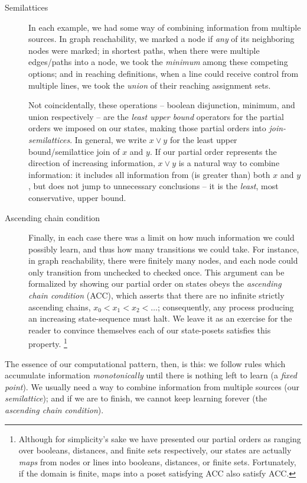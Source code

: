 \begin{description}
\item[Semilattices] In each example, we had some way of combining information
  from multiple sources. In graph reachability, we marked a node if \emph{any}
  of its neighboring nodes were marked; in shortest paths, when there were
  multiple edges/paths into a node, we took the \emph{minimum} among these
  competing options; and in reaching definitions, when a line could receive
  control from multiple lines, we took the \emph{union} of their reaching
  assignment sets.

  Not coincidentally, these operations -- boolean disjunction, minimum, and
  union respectively -- are the \emph{least upper bound} operators for the
  partial orders we imposed on our states, making those partial orders into
  \emph{join-semilattices}.
%
  In general, we write $x \vee y$ for the least upper bound/semilattice join of
  $x$ and $y$. If our partial order represents the direction of increasing
  information, $x \vee y$ is a natural way to combine information: it includes
  all information from (is greater than) both $x$ and $y$, but does not jump to
  unnecessary conclusions -- it is the \emph{least}, most conservative, upper
  bound.

\item[Ascending chain condition] Finally, in each case there was a limit on how
  much information we could possibly learn, and thus how many transitions we
  could take. For instance, in graph reachability, there were finitely many
  nodes, and each node could only transition from unchecked to checked once.
%
  This argument can be formalized by showing our partial order on states obeys
  the \emph{ascending chain condition} (ACC), which asserts that there are no
  infinite strictly ascending chains, $x_0 < x_1 < x_2 < \dots$; consequently,
  any process producing an increasing state-sequence must halt.
%
  We leave it as an exercise for the reader to convince themselves each of our
  state-posets satisfies this property.%
%
  \footnote{Although for simplicity's sake we have presented our partial orders
    as ranging over booleans, distances, and finite sets respectively, our
    states are actually \emph{maps} from nodes or lines into booleans,
    distances, or finite sets. Fortunately, if the domain is finite, maps into a
    poset satisfying ACC also satisfy ACC.}
\end{description}

\noindent
%
The essence of our computational pattern, then, is this: we follow rules which accumulate information \emph{monotonically} until there is nothing left to learn (a \emph{fixed point}). We usually need a way to combine information from multiple sources (our \emph{semilattice}); and if we are to finish, we cannot keep learning forever (the \emph{ascending chain condition}).

